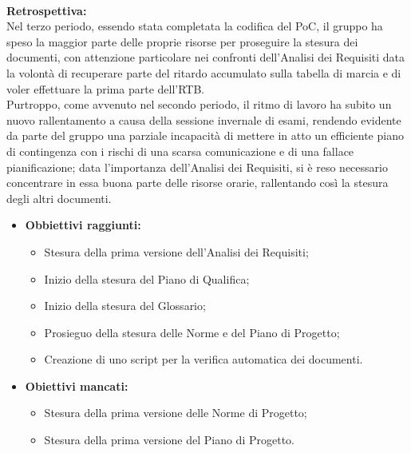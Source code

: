 \paragraph{}
\textbf{Retrospettiva:} \\
Nel terzo periodo, essendo stata completata la codifica del PoC, il gruppo ha speso la maggior parte delle proprie risorse per proseguire la stesura dei documenti, con attenzione
particolare nei confronti dell'Analisi dei Requisiti data la volontà di recuperare parte del ritardo accumulato sulla tabella di marcia e di voler effettuare la prima parte dell'RTB.\\
Purtroppo, come avvenuto nel secondo periodo, il ritmo di lavoro ha subito un nuovo rallentamento a causa della sessione invernale di esami, rendendo evidente da parte del gruppo una
parziale incapacità di mettere in atto un efficiente piano di contingenza con i rischi di una scarsa comunicazione e di una fallace pianificazione; data l'importanza dell'Analisi
dei Requisiti, si è reso necessario concentrare in essa buona parte delle risorse orarie, rallentando così la stesura degli altri documenti.
\begin{itemize}
    \item \textbf{Obbiettivi raggiunti:}
    \begin{itemize}
        \item Stesura della prima versione dell'Analisi dei Requisiti;
        \item Inizio della stesura del Piano di Qualifica;
        \item Inizio della stesura del Glossario;
        \item Prosieguo della stesura delle Norme e del Piano di Progetto;
        \item Creazione di uno script per la verifica automatica dei documenti.
    \end{itemize}
    \item \textbf{Obiettivi mancati:}
    \begin{itemize}
        \item Stesura della prima versione delle Norme di Progetto;
        \item Stesura della prima versione del Piano di Progetto.
    \end{itemize}
\end{itemize}